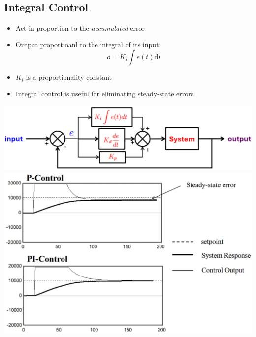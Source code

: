 \documentclass[10pt]{article}
\newcommand{\dd}{\text{d}}
\begin{document}
\subsection*{Integral Control}
\begin{itemize}
	\item Act in proportion to the \textit{accumulated} error
    \item Output proportioanl to the integral of its input:
    \[o = K_i \int e(t) \dd t\]
    \item $K_i$ is a proportionality constant
    \item Integral control is useful for eliminating steady-state errors
\end{itemize}
\begin{center} 
	\includegraphics*[width=\textwidth]{L2_15.png} \\
    \includegraphics*[width=\textwidth]{L2_16.png} \\
\end{center}
\end{document}
